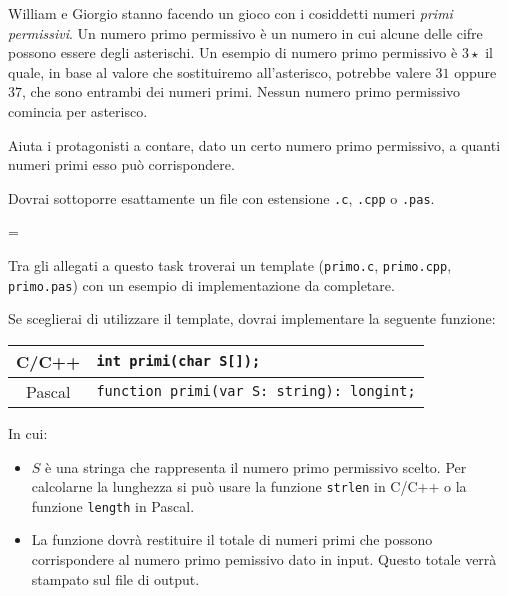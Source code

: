 \usepackage{xcolor}
\usepackage{afterpage}
\usepackage{pifont,mdframed}
\usepackage[bottom]{footmisc}

\makeatletter
\gdef\this@inputfilename{input.txt}
\gdef\this@outputfilename{output.txt}
\makeatother

\newcommand{\inputfile}{\texttt{input.txt}}
\newcommand{\outputfile}{\texttt{output.txt}}

\newenvironment{warning}
  {\par\begin{mdframed}[linewidth=2pt,linecolor=gray]%
    \begin{list}{}{\leftmargin=1cm
                   \labelwidth=\leftmargin}\item[\Large\ding{43}]}
  {\end{list}\end{mdframed}\par}

William e Giorgio stanno facendo un gioco con i cosiddetti numeri \emph{primi permissivi}. Un numero primo permissivo è un numero in cui alcune delle cifre possono essere degli asterischi. Un esempio di numero primo permissivo è $3\star$ il quale, in base al valore che sostituiremo all'asterisco, potrebbe valere $31$ oppure $37$, che sono entrambi dei numeri primi. Nessun numero primo permissivo comincia per asterisco.

Aiuta i protagonisti a contare, dato un certo numero primo permissivo, a quanti numeri primi esso può corrispondere.

\Implementation
Dovrai sottoporre esattamente un file con estensione \texttt{.c}, \texttt{.cpp} o \texttt{.pas}.

\begin{warning}
Tra gli allegati a questo task troverai un template (\texttt{primo.c}, \texttt{primo.cpp}, \texttt{primo.pas}) con un esempio di implementazione da completare.
\end{warning}

Se sceglierai di utilizzare il template, dovrai implementare la seguente funzione:
\begin{center}\begin{tabularx}{\textwidth}{|c|X|}
\hline
C/C++  & \verb|int primi(char S[]);|\\
\hline
Pascal & \verb|function primi(var S: string): longint;|\\
\hline
\end{tabularx}\end{center}
In cui:
\begin{itemize}[nolistsep]
  \item $S$ è una stringa che rappresenta il numero primo permissivo scelto. Per calcolarne la lunghezza si può usare la funzione \texttt{strlen} in C/C++ o la funzione \texttt{length} in Pascal.
  \item La funzione dovrà restituire il totale di numeri primi che possono corrispondere al numero primo pemissivo dato in input. Questo totale verrà stampato sul file di output.
\end{itemize}

